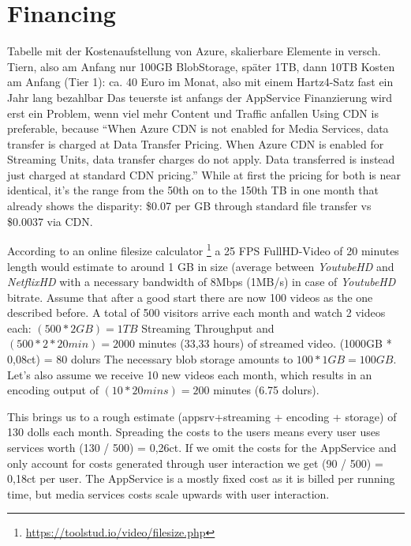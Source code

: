 \documentclass[english]{lni}
\begin{document}
\section{Financing}
Tabelle mit der Kostenaufstellung von Azure, skalierbare Elemente
in versch. Tiern, also am Anfang nur 100GB BlobStorage, später 1TB, dann 10TB
Kosten am Anfang (Tier 1): ca. 40 Euro im Monat, also mit einem Hartz4-Satz fast ein Jahr lang bezahlbar
Das teuerste ist anfangs der AppService
Finanzierung wird erst ein Problem, wenn viel mehr Content und Traffic anfallen
Using CDN is preferable, because ``When Azure CDN is not enabled for Media Services, data transfer is charged at Data Transfer Pricing. When Azure CDN is enabled for Streaming Units, data transfer charges do not apply. Data transferred is instead just charged at standard CDN pricing.'' 
While at first the pricing for both is near identical, it's the range from the 50th on to the 150th TB in one month that already shows the disparity: \$0.07 per GB through standard file transfer vs  \$0.0037 via CDN.

According to an online filesize calculator \footnote{\url{https://toolstud.io/video/filesize.php}} a 25 FPS FullHD-Video of 20 minutes length would estimate to around 1 GB in size (average between \textit{YoutubeHD} and \textit{NetflixHD} with a necessary bandwidth of 8Mbps (1MB/s) in case of \textit{YoutubeHD} bitrate.  %
Assume that after a good start there are now 100 videos as the one described before. A total of 500 visitors arrive each month and watch 2 videos each: $(500 \ast 2 GB) = 1TB$ Streaming Throughput and $(500 \ast 2 \ast 20 min)  = 2000$ minutes (33,33 hours) of streamed video. (1000GB * 0,08ct) = 80 dolurs
The necessary blob storage amounts to $100 \ast 1GB = 100GB$. 
Let's also assume we receive 10 new videos each month, which results in an encoding output of $(10 \ast 20 mins) = 200$ minutes (6.75 dolurs).  

This brings us to a rough estimate (appsrv+streaming + encoding + storage) of 130 dolls each month. Spreading the costs to the users means every user uses services worth (130 / 500) = 0,26ct. If we omit the costs for the AppService and only account for costs generated through user interaction we get (90 / 500) = 0,18ct per user. The AppService is a mostly fixed cost as it is billed per running time, but media services costs scale upwards with user interaction.
\end{document}
